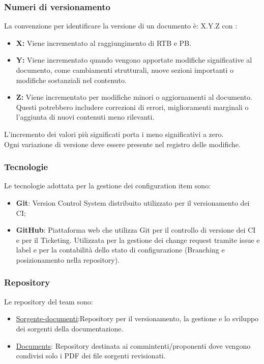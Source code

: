 \documentclass{article}
\begin{document}
\subsubsection{Numeri di versionamento}\label{sec:versionamento}
La convenzione per identificare la versione di un documento è: X.Y.Z
con :
\begin{itemize}
    \item \textbf{X: }Viene incrementato al raggiungimento di RTB e PB.
    \item \textbf{Y: }Viene incrementato quando vengono apportate modifiche significative al documento, come cambiamenti strutturali, nuove sezioni importanti o modifiche sostanziali nel contenuto.
    \item \textbf{Z: }Viene incrementato per modifiche minori o aggiornamenti al documento. Questi potrebbero includere correzioni di errori, miglioramenti marginali o l'aggiunta di nuovi contenuti meno rilevanti.
\end{itemize}

L'incremento dei valori più significati  porta i meno significativi a zero. \\
Ogni variazione di versione deve essere presente nel registro delle modifiche.
\subsubsection{Tecnologie}
Le tecnologie adottata per la gestione dei configuration item sono:
\begin{itemize}
    \item \textbf{Git}: Version Control System distribuito utilizzato per il versionamento dei CI;
    \item \textbf{GitHub}: Piattaforma web che utilizza Git per il controllo di versione dei CI e per il Ticketing.
          Utilizzata per la gestione dei change request tramite issue e label e per la contabilità dello stato di configurazione (Branching e posizionamento nella repository).
\end{itemize}

\subsubsection{Repository}
Le repository del team sono:
\begin{itemize}
    \item \href{https://github.com/ByteOps-swe/Sorgente-documenti}{Sorgente-documenti}:Repository per il versionamento, la gestione e lo sviluppo dei sorgenti della documentazione.
    \item \href{https://github.com/ByteOps-swe/Documents}{Documents}: Repository destinata ai commintenti/proponenti dove vengono condivisi solo i PDF dei file sorgenti revisionati.
\end{itemize}
\end{document}
